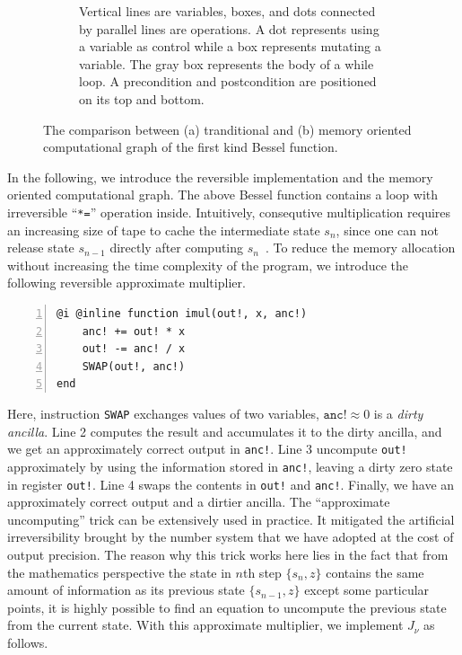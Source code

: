 \documentclass[aps,twocolumn,longbibliography,english,superscriptaddress]{revtex4-1}
\newcommand{\<}{\langle}
\renewcommand{\>}{\rangle}
\theoremstyle{definition}\newtheorem{definition}{\textit{Definition}}
\begin{document}
\begin{figure}[t!]
\begin{subfigure}[t]{0.47\textwidth}
        \caption{Vertical lines are variables, boxes, and dots connected by parallel lines are operations. A dot represents using a variable as control while a box represents mutating a variable. 
        The gray box represents the body of a while loop. A precondition and postcondition are positioned on its top and bottom.}\label{fig:datagraph}
    \end{subfigure}
    \caption{The comparison between (a) tranditional and (b) memory oriented computational graph of the first kind Bessel function.}\label{fig:cgraphs}
\end{figure}

In the following, we introduce the reversible implementation and the memory oriented computational graph.
The above Bessel function contains a loop with irreversible ``\texttt{*=}'' operation inside.
Intuitively, consequtive multiplication requires an increasing size of tape to cache the intermediate state $s_n$, since one can not release state $s_{n-1}$ directly after computing $s_n$~\cite{Perumalla2013}.
To reduce the memory allocation without increasing the time complexity of the program, we introduce the following reversible approximate multiplier.

\begin{minipage}{.44\textwidth}
    \begin{lstlisting}[numberstyle=\scriptsize\color{gray},numbers=left,numbersep=8pt]
@i @inline function imul(out!, x, anc!)
    anc! += out! * x
    out! -= anc! / x
    SWAP(out!, anc!)
end
\end{lstlisting}
\end{minipage}

Here, instruction \texttt{SWAP} exchanges values of two variables, $\texttt{anc!} \approx 0$ is a \textit{dirty ancilla}.
Line 2 computes the result and accumulates it to the dirty ancilla, and we get an approximately correct output in \texttt{anc!}.
Line 3 uncompute \texttt{out!} approximately by using the information stored in \texttt{anc!}, leaving a dirty zero state in register \texttt{out!}.
Line 4 swaps the contents in \texttt{out!} and \texttt{anc!}.
Finally, we have an approximately correct output and a dirtier ancilla.
The ``approximate uncomputing'' trick can be extensively used in practice. It mitigated the artificial irreversibility brought by the number system that we have adopted at the cost of output precision.
The reason why this trick works here lies in the fact that from the mathematics perspective the state in $n$th step $\{s_n, z\}$ contains the same amount of information as its previous state  $\{s_{n-1}, z\}$ except some particular points, it is highly possible to find an equation to uncompute the previous state from the current state.
With this approximate multiplier, we implement $J_\nu$ as follows.
\end{document}
